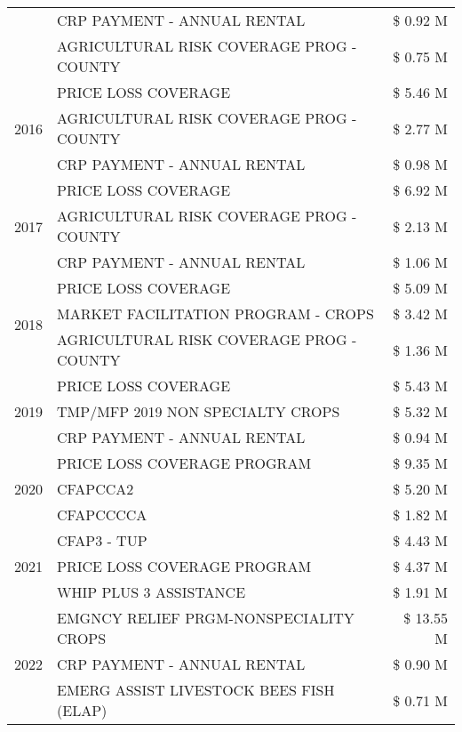 \begin{tabular}{llr}
 & CRP PAYMENT - ANNUAL RENTAL & \$ 0.92 M \\
 & AGRICULTURAL RISK COVERAGE PROG - COUNTY & \$ 0.75 M \\
\cline{1-3}
\multirow[t]{3}{*}{2016} & PRICE LOSS COVERAGE & \$ 5.46 M \\
 & AGRICULTURAL RISK COVERAGE PROG - COUNTY & \$ 2.77 M \\
 & CRP PAYMENT - ANNUAL RENTAL & \$ 0.98 M \\
\cline{1-3}
\multirow[t]{3}{*}{2017} & PRICE LOSS COVERAGE & \$ 6.92 M \\
 & AGRICULTURAL RISK COVERAGE PROG - COUNTY & \$ 2.13 M \\
 & CRP PAYMENT - ANNUAL RENTAL & \$ 1.06 M \\
\cline{1-3}
\multirow[t]{3}{*}{2018} & PRICE LOSS COVERAGE & \$ 5.09 M \\
 & MARKET FACILITATION PROGRAM - CROPS & \$ 3.42 M \\
 & AGRICULTURAL RISK COVERAGE PROG - COUNTY & \$ 1.36 M \\
\cline{1-3}
\multirow[t]{3}{*}{2019} & PRICE LOSS COVERAGE & \$ 5.43 M \\
 & TMP/MFP 2019 NON SPECIALTY CROPS & \$ 5.32 M \\
 & CRP PAYMENT - ANNUAL RENTAL & \$ 0.94 M \\
\cline{1-3}
\multirow[t]{3}{*}{2020} & PRICE LOSS COVERAGE PROGRAM & \$ 9.35 M \\
 & CFAPCCA2 & \$ 5.20 M \\
 & CFAPCCCCA & \$ 1.82 M \\
\cline{1-3}
\multirow[t]{3}{*}{2021} & CFAP3 - TUP & \$ 4.43 M \\
 & PRICE LOSS COVERAGE PROGRAM & \$ 4.37 M \\
 & WHIP PLUS 3 ASSISTANCE & \$ 1.91 M \\
\cline{1-3}
\multirow[t]{3}{*}{2022} & EMGNCY RELIEF PRGM-NONSPECIALITY CROPS & \$ 13.55 M \\
 & CRP PAYMENT - ANNUAL RENTAL & \$ 0.90 M \\
 & EMERG ASSIST LIVESTOCK BEES FISH (ELAP) & \$ 0.71 M \\
\cline{1-3}
\bottomrule
\end{tabular}
